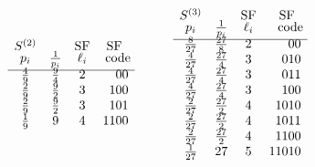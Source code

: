 \documentclass[11pt]{article}
\begin{document}
\begin{itemize}
\[        \qquad\quad
        \begin{array}{cccr}
           S^{(2)}  &               & \text{SF} &  \text{SF\;\:}\\[-1mm]
           p_i      & \frac{1}{p_i} & \ell_i    &\!\text{code}\!\\[1mm]\hline\\[-5mm]
        \frac{4}{9} & \frac{9}{4}   &   2       &    00\\
        \frac{2}{9} & \frac{9}{2}   &   3       &   100\\
        \frac{2}{9} & \frac{9}{2}   &   3       &   101\\
        \frac{1}{9} &     9         &   4       &  1100\end{array}
        \qquad\quad
        \begin{array}{cccr}
           S^{(3)}   &               & \text{SF} &  \text{SF\;\:}\\[-1mm]
           p_i       & \frac{1}{p_i} & \ell_i    &\!\text{code}\!\\[1mm]\hline\\[-5mm]
        \frac{8}{27} & \frac{27}{8}  &   2       &    00\\
        \frac{4}{27} & \frac{27}{4}  &   3       &   010\\
        \frac{4}{27} & \frac{27}{4}  &   3       &   011\\
        \frac{4}{27} & \frac{27}{4}  &   3       &   100\\
        \frac{2}{27} & \frac{27}{2}  &   4       &  1010\\
        \frac{2}{27} & \frac{27}{2}  &   4       &  1011\\
        \frac{2}{27} & \frac{27}{2}  &   4       &  1100\\
        \frac{1}{27} &     27        &   5       & 11010\end{array}
        \]
\end{itemize}
\end{document}
